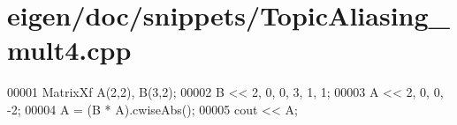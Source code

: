 \hypertarget{eigen_2doc_2snippets_2_topic_aliasing__mult4_8cpp_source}{}\section{eigen/doc/snippets/\+Topic\+Aliasing\+\_\+mult4.cpp}
\label{eigen_2doc_2snippets_2_topic_aliasing__mult4_8cpp_source}

\begin{DoxyCode}
00001 MatrixXf A(2,2), B(3,2);
00002 B << 2, 0,  0, 3, 1, 1;
00003 A << 2, 0, 0, -2;
00004 A = (B * A).cwiseAbs();
00005 cout << A;
\end{DoxyCode}
